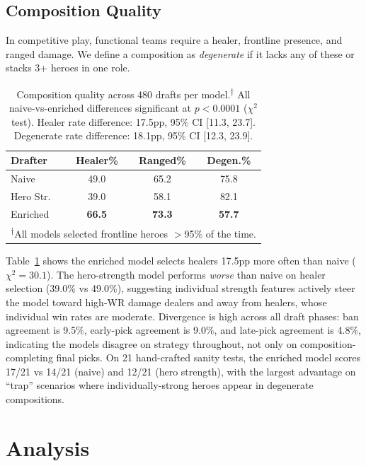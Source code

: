 \documentclass[conference]{IEEEtran}
\begin{document}
\subsection{Composition Quality}

In competitive play, functional teams require a healer, frontline presence, and ranged damage. We define a composition as \textit{degenerate} if it lacks any of these or stacks 3+ heroes in one role.

\begin{table}[t]
\centering
\caption{Composition quality across 480 drafts per model.\textsuperscript{$\dagger$} All naive-vs-enriched differences significant at $p\!<\!0.0001$ ($\chi^2$ test). Healer rate difference: 17.5pp, 95\% CI [11.3, 23.7]. Degenerate rate difference: 18.1pp, 95\% CI [12.3, 23.9].}
\label{tab:comp}
\begin{tabular}{lccc}
\toprule
Drafter & Healer\% & Ranged\% & Degen.\% \\
\midrule
Naive & 49.0 & 65.2 & 75.8 \\
Hero Str. & 39.0 & 58.1 & 82.1 \\
Enriched & \textbf{66.5} & \textbf{73.3} & \textbf{57.7} \\
\bottomrule
\multicolumn{4}{l}{\footnotesize\textsuperscript{$\dagger$}All models selected frontline heroes $>$95\% of the time.}
\end{tabular}
\end{table}

Table~\ref{tab:comp} shows the enriched model selects healers 17.5pp more often than naive ($\chi^2\!=\!30.1$). The hero-strength model performs \textit{worse} than naive on healer selection (39.0\% vs 49.0\%), suggesting individual strength features actively steer the model toward high-WR damage dealers and away from healers, whose individual win rates are moderate. Divergence is high across all draft phases: ban agreement is 9.5\%, early-pick agreement is 9.0\%, and late-pick agreement is 4.8\%, indicating the models disagree on strategy throughout, not only on composition-completing final picks. On 21 hand-crafted sanity tests, the enriched model scores 17/21 vs 14/21 (naive) and 12/21 (hero strength), with the largest advantage on ``trap'' scenarios where individually-strong heroes appear in degenerate compositions.

\section{Analysis}
\end{document}
